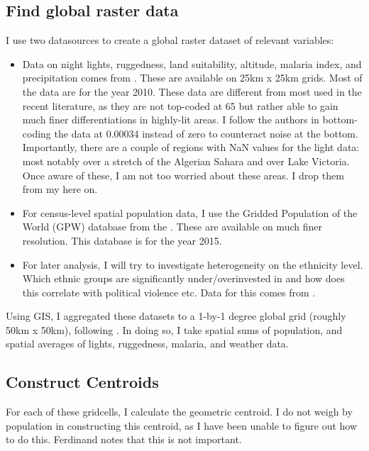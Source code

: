 \documentclass[11pt, oneside]{article}   	%
\begin{document}
\subsection{Find global raster data}
I use two datasources to create a global raster dataset of relevant variables:
\begin{itemize}
\item Data on night lights, ruggedness, land suitability, altitude, malaria index, and precipitation comes from \cite{henderson_global_2018}. These are available on 25km x 25km grids. Most of the data are for the year 2010. These data are different from most used in the recent literature, as they are not top-coded at 65 but rather able to gain much finer differentiations in highly-lit areas. I follow the authors in bottom-coding the data at 0.00034 instead of zero to counteract noise at the bottom. Importantly, there are a couple of regions with NaN values for the \citeauthor{henderson_global_2018} light data: most notably over a stretch of the Algerian Sahara and over  Lake Victoria. Once aware of these, I am not too worried about these areas. I drop them from my here on.
\item For census-level spatial population data, I use the Gridded Population of the World (GPW) database from the \cite{socioeconomic_data_and_applications_center_gridded_2016}. These are available on much finer resolution. This database is for the year 2015.
\item For later analysis, I will try to investigate heterogeneity on the ethnicity level. Which ethnic groups are significantly under/overinvested in and how does this correlate with political violence etc. Data for this comes from \cite{michalopoulos_long-run_2016}.
\end{itemize}

Using GIS, I aggregated these datasets to a 1-by-1 degree global grid (roughly 50km x 50km), following \cite{fajgelbaum_optimal_2017}. In doing so, I take spatial sums of population, and spatial averages of lights, ruggedness, malaria, and weather data.

\subsection{Construct Centroids}
For each of these gridcells, I calculate the geometric centroid. I do not weigh by population in constructing this centroid, as I have been unable to figure out how to do this. Ferdinand notes that this is not important.
\end{document}
